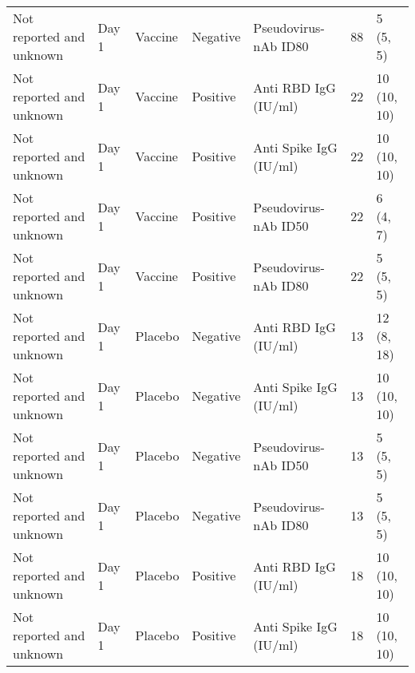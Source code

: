 \documentclass[]{book}
\theoremstyle{definition}
\theoremstyle{definition}
\theoremstyle{definition}
\newcommand{\1}{\mathbbm{1}}
\begin{document}
\begin{landscape}
\begin{ThreePartTable}
\begin{longtable}[t]{>{\raggedright\arraybackslash}p{7cm}llllll}
\hspace{1em}Not reported and unknown & Day 1 & Vaccine & Negative & Pseudovirus-nAb ID80 & 88 & \makecell[l]{5\\(5, 5)}\\
\hspace{1em}Not reported and unknown & Day 1 & Vaccine & Positive & Anti RBD IgG (IU/ml) & 22 & \makecell[l]{10\\(10, 10)}\\
\hspace{1em}Not reported and unknown & Day 1 & Vaccine & Positive & Anti Spike IgG (IU/ml) & 22 & \makecell[l]{10\\(10, 10)}\\
\hspace{1em}Not reported and unknown & Day 1 & Vaccine & Positive & Pseudovirus-nAb ID50 & 22 & \makecell[l]{6\\(4, 7)}\\
\hspace{1em}Not reported and unknown & Day 1 & Vaccine & Positive & Pseudovirus-nAb ID80 & 22 & \makecell[l]{5\\(5, 5)}\\
\hspace{1em}Not reported and unknown & Day 1 & Placebo & Negative & Anti RBD IgG (IU/ml) & 13 & \makecell[l]{12\\(8, 18)}\\
\hspace{1em}Not reported and unknown & Day 1 & Placebo & Negative & Anti Spike IgG (IU/ml) & 13 & \makecell[l]{10\\(10, 10)}\\
\hspace{1em}Not reported and unknown & Day 1 & Placebo & Negative & Pseudovirus-nAb ID50 & 13 & \makecell[l]{5\\(5, 5)}\\
\hspace{1em}Not reported and unknown & Day 1 & Placebo & Negative & Pseudovirus-nAb ID80 & 13 & \makecell[l]{5\\(5, 5)}\\
\hspace{1em}Not reported and unknown & Day 1 & Placebo & Positive & Anti RBD IgG (IU/ml) & 18 & \makecell[l]{10\\(10, 10)}\\
\hspace{1em}Not reported and unknown & Day 1 & Placebo & Positive & Anti Spike IgG (IU/ml) & 18 & \makecell[l]{10\\(10, 10)}\\

\end{longtable}
\end{ThreePartTable}
\end{landscape}
\end{document}
